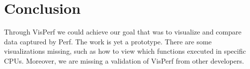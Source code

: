 \section{Conclusion}

Through VisPerf we could achieve our goal that was to visualize and compare data captured by Perf. The work is yet a prototype. There are some visualizations missing, such as how to view which functions executed in specific CPUs. Moreover, we are missing a validation of VisPerf from other developers.

